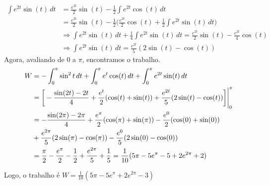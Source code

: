 \documentclass[../main.tex]{subfiles}
\begin{document}
\begin{solucao}
\begin{enumerate}[label=\alph*)]
\begin{align*}
				\int e^{2t}\sin(t)\, dt
				&= \frac{e^{2t}}{2}\sin(t)-\frac{1}{2}\int e^{2t}\cos(t)\, dt\\
				&= \frac{e^{2t}}{2}\sin(t)-\frac{1}{2}\bigg(\frac{e^{2t}}{2}\cos(t)+\frac{1}{2}\int e^{2t}\sin(t)\, dt\bigg)\\
				&\Rightarrow \int e^{2t}\sin(t)\, dt+\frac{1}{4}\int e^{2t}\sin(t)\, dt =\frac{e^{2t}}{2}\sin(t)-\frac{e^{2t}}{4}\cos(t)\\
				&\Rightarrow \int e^{2t}\sin(t)\, dt =\frac{e^{2t}}{5}(2\sin(t)-\cos(t))
			\end{align*}
			Agora, avaliando de $0$ a $\pi$, encontramos o trabalho.
			\begin{align*}
				W
				&= -\int_0^\pi \sin^2t\, dt +\int_0^\pi e^t\cos(t)\, dt +\int_0^\pi e^{2t}\sin(t)\, dt\\
				&= \bigg[-\frac{\sin(2t)-2t}{4} + \frac{e^t}{2}(\cos(t)+\sin(t))+\frac{e^{2t}}{5}(2\sin(t)-\cos(t))\bigg]\Biggr{|}_0^\pi\\
				&=-\frac{\sin(2\pi)-2\pi}{4} + \frac{e^\pi}{2}(\cos(\pi)+\sin(\pi))-\frac{e^0}{2}(\cos(0)+\sin(0))\\&+\frac{e^{2\pi}}{5}(2\sin(\pi)-\cos(\pi))-\frac{e^0}{5}(2\sin(0)-\cos(0))\\
				&=\frac{\pi}{2} - \frac{e^\pi}{2}-\frac{1}{2}+\frac{e^{2\pi}}{5}+\frac{1}{5}=\frac{1}{10}(5\pi-5e^\pi-5+2e^{2\pi}+2)
			\end{align*}
			
			Logo, o trabalho é $W = \frac{1}{10}(5\pi-5e^\pi+2e^{2\pi}-3)$
		\end{enumerate}
	\end{solucao}
	
\end{document}
